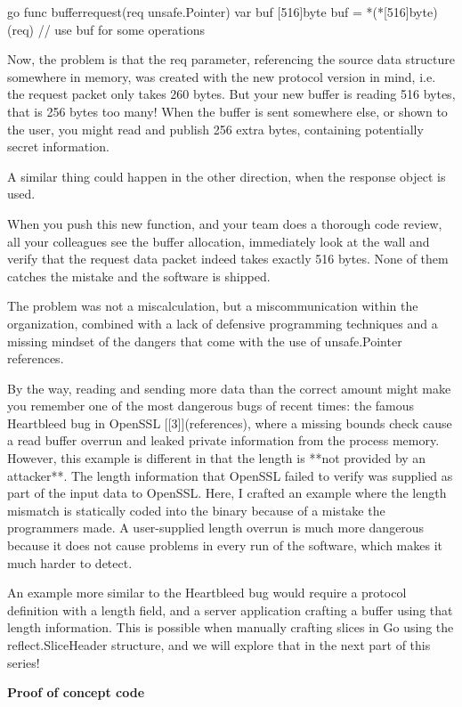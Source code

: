 go
func bufferrequest(req unsafe.Pointer)
var buf [516]byte
buf = *(*[516]byte)(req)
// use buf for some operations



Now, the problem is that the req parameter, referencing the source data structure somewhere in memory, was created
with the new protocol version in mind, i.e. the request packet only takes 260 bytes. But your new buffer is reading
516 bytes, that is 256 bytes too many! When the buffer is sent somewhere else, or shown to the user, you might read
and publish 256 extra bytes, containing potentially secret information.

A similar thing could happen in the other direction, when the response object is used.

When you push this new function, and your team does a thorough code review, all your colleagues see the buffer allocation,
immediately look at the wall and verify that the request data packet indeed takes exactly 516 bytes. None of them catches
the mistake and the software is shipped.

The problem was not a miscalculation, but a miscommunication within the organization, combined with a lack of defensive
programming techniques and a missing mindset of the dangers that come with the use of unsafe.Pointer references.

By the way, reading and sending more data than the correct amount might make you remember one of the most dangerous bugs
of recent times: the famous Heartbleed bug in OpenSSL [[3]](references), where a missing bounds check cause a read
buffer overrun and leaked private information from the process memory. However, this example is different in that the
length is **not provided by an attacker**. The length information that OpenSSL failed to verify was supplied as part of
the input data to OpenSSL. Here, I crafted an example where the length mismatch is statically coded into the binary
because of a mistake the programmers made. A user-supplied length overrun is much more dangerous because it does not
cause problems in every run of the software, which makes it much harder to detect.

An example more similar to the Heartbleed bug would require a protocol definition with a length field, and a server
application crafting a buffer using that length information. This is possible when manually crafting slices in Go using
the reflect.SliceHeader structure, and we will explore that in the next part of this series!


\textbf{Proof of concept code}

